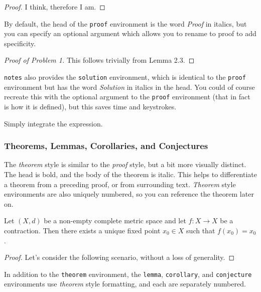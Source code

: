 \documentclass[diagram]{notes}
\begin{document}
\begin{proof}
I think, therefore I am.
\end{proof}

By default, the head of the \texttt{proof} environment is the word \emph{Proof} in italics, but you can specify an optional argument which allows you to rename to proof to add specificity.

\begin{proof}[Proof of Problem 1]
This follows trivially from Lemma 2.3.
\end{proof}

\texttt{notes} also provides the \texttt{solution} environment, which is identical to the \texttt{proof} environment but has the word \emph{Solution} in italics in the head. You could of course recreate this with the optional argument to the \texttt{proof} environment (that in fact is how it is defined), but this saves time and keystrokes.

\begin{solution}
Simply integrate the expression.
\end{solution}

\subsubsection{Theorems, Lemmas, Corollaries, and Conjectures}

The \emph{theorem} style is similar to the \emph{proof} style, but a bit more visually distinct. The head is bold, and the body of the theorem is italic. This helps to differentiate a theorem from a preceding proof, or from surrounding text. \emph{Theorem} style environments are also uniquely numbered, so you can reference the theorem later on.

\begin{theorem}\label{thm:banach}
Let $(X,d)$ be a non-empty complete metric space and let $f \colon X \to X$ be a contraction. Then there exists a unique fixed point $x_0 \in X$ such that $f(x_0) = x_0$.
\end{theorem}

\begin{proof}
Let's consider the following scenario, without a loss of generality.
\end{proof}

In addition to the \texttt{theorem} environment, the \texttt{lemma}, \texttt{corollary}, and \texttt{conjecture} environments use \emph{theorem} style formatting, and each are separately numbered.
\end{document}
